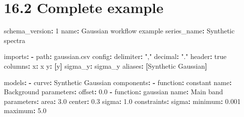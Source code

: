 \documentclass[
  10pt,
  a4paper,
  oneside]{scrreprt}
\newenvironment{Shaded}{}{}
\newcommand{\AttributeTok}[1]{\textcolor[rgb]{0.49,0.56,0.16}{#1}}
\newcommand{\CharTok}[1]{\textcolor[rgb]{0.25,0.44,0.63}{#1}}
\newcommand{\DecValTok}[1]{\textcolor[rgb]{0.25,0.63,0.44}{#1}}
\newcommand{\FloatTok}[1]{\textcolor[rgb]{0.25,0.63,0.44}{#1}}
\newcommand{\FunctionTok}[1]{\textcolor[rgb]{0.02,0.16,0.49}{#1}}
\newcommand{\KeywordTok}[1]{\textcolor[rgb]{0.00,0.44,0.13}{\textbf{#1}}}
\newcommand{\StringTok}[1]{\textcolor[rgb]{0.25,0.44,0.63}{#1}}
\begin{document}
\hypertarget{complete-example}{%
\section{16.2 Complete example}\label{complete-example}}

\begin{Shaded}
\begin{Highlighting}[]
\FunctionTok{schema\_version}\KeywordTok{:}\AttributeTok{ }\DecValTok{1}
\FunctionTok{name}\KeywordTok{:}\AttributeTok{ Gaussian workflow example}
\FunctionTok{series\_name}\KeywordTok{:}\AttributeTok{ Synthetic spectra}

\FunctionTok{imports}\KeywordTok{:}
\AttributeTok{  }\KeywordTok{{-}}\AttributeTok{ }\FunctionTok{path}\KeywordTok{:}\AttributeTok{ gaussian.csv}
\AttributeTok{    }\FunctionTok{config}\KeywordTok{:}
\AttributeTok{      }\FunctionTok{delimiter}\KeywordTok{:}\AttributeTok{ }\StringTok{","}
\AttributeTok{      }\FunctionTok{decimal}\KeywordTok{:}\AttributeTok{ }\StringTok{"."}
\AttributeTok{      }\FunctionTok{header}\KeywordTok{:}\AttributeTok{ }\CharTok{true}
\AttributeTok{    }\FunctionTok{columns}\KeywordTok{:}
\AttributeTok{      }\FunctionTok{x}\KeywordTok{:}\AttributeTok{ x}
\AttributeTok{      }\FunctionTok{y}\KeywordTok{:}\AttributeTok{ }\KeywordTok{[}\CharTok{y}\KeywordTok{]}
\AttributeTok{      }\FunctionTok{sigma\_y}\KeywordTok{:}\AttributeTok{ sigma\_y}
\AttributeTok{    }\FunctionTok{aliases}\KeywordTok{:}\AttributeTok{ }\KeywordTok{[}\AttributeTok{Synthetic Gaussian}\KeywordTok{]}

\FunctionTok{models}\KeywordTok{:}
\AttributeTok{  }\KeywordTok{{-}}\AttributeTok{ }\FunctionTok{curve}\KeywordTok{:}\AttributeTok{ Synthetic Gaussian}
\AttributeTok{    }\FunctionTok{components}\KeywordTok{:}
\AttributeTok{      }\KeywordTok{{-}}\AttributeTok{ }\FunctionTok{function}\KeywordTok{:}\AttributeTok{ constant}
\AttributeTok{        }\FunctionTok{name}\KeywordTok{:}\AttributeTok{ Background}
\AttributeTok{        }\FunctionTok{parameters}\KeywordTok{:}
\AttributeTok{          }\FunctionTok{offset}\KeywordTok{:}\AttributeTok{ }\FloatTok{0.0}
\AttributeTok{      }\KeywordTok{{-}}\AttributeTok{ }\FunctionTok{function}\KeywordTok{:}\AttributeTok{ gaussian}
\AttributeTok{        }\FunctionTok{name}\KeywordTok{:}\AttributeTok{ Main band}
\AttributeTok{        }\FunctionTok{parameters}\KeywordTok{:}
\AttributeTok{          }\FunctionTok{area}\KeywordTok{:}\AttributeTok{ }\FloatTok{3.0}
\AttributeTok{          }\FunctionTok{center}\KeywordTok{:}\AttributeTok{ }\FloatTok{0.3}
\AttributeTok{          }\FunctionTok{sigma}\KeywordTok{:}\AttributeTok{ }\FloatTok{1.0}
\AttributeTok{        }\FunctionTok{constraints}\KeywordTok{:}
\AttributeTok{          }\FunctionTok{sigma}\KeywordTok{:}
\AttributeTok{            }\FunctionTok{minimum}\KeywordTok{:}\AttributeTok{ }\FloatTok{0.001}
\AttributeTok{            }\FunctionTok{maximum}\KeywordTok{:}\AttributeTok{ }\FloatTok{5.0}


\end{Highlighting}
\end{Shaded}
\end{document}
